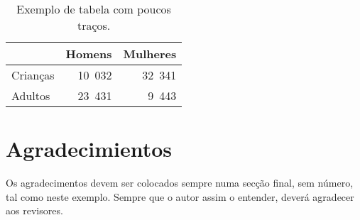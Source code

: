 \documentclass[a4paper, twocolumn, 11pt, twoside]{article}
\begin{document}
\begin{table}[htb]
  \centering
  \begin{tabular}{lrr}
    \toprule
    & \textbf{Homens} & \textbf{Mulheres} \\
    \midrule
    Crianças & 10~032 & 32~341 \\
    Adultos & 23~431 & 9~443 \\
    \bottomrule
  \end{tabular}
  \caption{Exemplo de tabela com poucos traços.}
  \label{tab:1}
\end{table}



\section*{Agradecimientos}

Os agradecimentos devem ser colocados sempre numa secção final, sem número, tal como
neste exemplo. Sempre que o autor assim o entender, deverá agradecer aos revisores.



\end{document}
